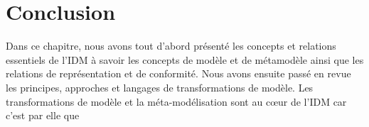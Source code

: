 \section{Conclusion}

Dans ce chapitre, nous avons tout d'abord présenté les concepts et relations essentiels de l'IDM
à savoir les concepts de modèle et de métamodèle ainsi que les relations de représentation et de conformité.
Nous avons ensuite passé en revue les principes, approches et langages de transformations de modèle. Les transformations
de modèle et la méta-modélisation sont au cœur de l'IDM car c'est par elle que 













